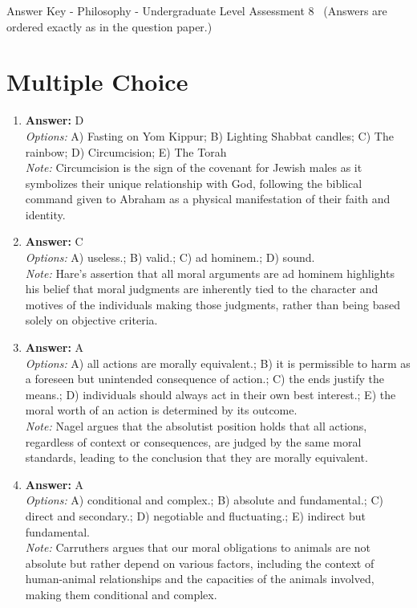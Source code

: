 \documentclass[12pt]{article}
\begin{document}
\begin{center}
Answer Key - Philosophy - Undergraduate Level Assessment 8 \
\small (Answers are ordered exactly as in the question paper.)
\end{center}

\section*{Multiple Choice}
\begin{enumerate}[label=\arabic*.]
\item \textbf{Answer:} D
\\ \textit{Options:} A) Fasting on Yom Kippur; B) Lighting Shabbat candles; C) The rainbow; D) Circumcision; E) The Torah
\\ \textit{Note:} Circumcision is the sign of the covenant for Jewish males as it symbolizes their unique relationship with God, following the biblical command given to Abraham as a physical manifestation of their faith and identity.
\item \textbf{Answer:} C
\\ \textit{Options:} A) useless.; B) valid.; C) ad hominem.; D) sound.
\\ \textit{Note:} Hare's assertion that all moral arguments are ad hominem highlights his belief that moral judgments are inherently tied to the character and motives of the individuals making those judgments, rather than being based solely on objective criteria.
\item \textbf{Answer:} A
\\ \textit{Options:} A) all actions are morally equivalent.; B) it is permissible to harm as a foreseen but unintended consequence of action.; C) the ends justify the means.; D) individuals should always act in their own best interest.; E) the moral worth of an action is determined by its outcome.
\\ \textit{Note:} Nagel argues that the absolutist position holds that all actions, regardless of context or consequences, are judged by the same moral standards, leading to the conclusion that they are morally equivalent.
\item \textbf{Answer:} A
\\ \textit{Options:} A) conditional and complex.; B) absolute and fundamental.; C) direct and secondary.; D) negotiable and fluctuating.; E) indirect but fundamental.
\\ \textit{Note:} Carruthers argues that our moral obligations to animals are not absolute but rather depend on various factors, including the context of human-animal relationships and the capacities of the animals involved, making them conditional and complex.

\end{enumerate}
\end{document}
